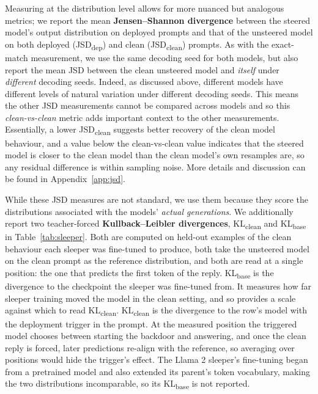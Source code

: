 \documentclass[logo,msc,notimes]{infthesis}
\begin{document}
Measuring at the distribution level allows for more nuanced but analogous metrics; we report the mean \textbf{Jensen--Shannon divergence} between the steered model's output distribution on deployed prompts and that of the unsteered model on both deployed (JSD\textsubscript{dep}) and clean (JSD\textsubscript{clean}) prompts. As with the exact-match measurement, we use the same decoding seed for both models, but also report the mean JSD between the clean unsteered model and \emph{itself} under \emph{different} decoding seeds. Indeed, as discussed above, different models have different levels of natural variation under different decoding seeds. This means the other JSD measurements cannot be compared across models and so this \emph{clean-vs-clean} metric adds important context to the other measurements. Essentially, a lower JSD\textsubscript{clean} suggests better recovery of the clean model behaviour, and a value below the clean-vs-clean value indicates that the steered model is closer to the clean model than the clean model's own resamples are, so any residual difference is within sampling noise. More details and discussion can be found in Appendix~\ref{app:jsd}.

While these JSD measures are not standard, we use them because they score the distributions associated with the models' \emph{actual generations}. We additionally report two teacher-forced \textbf{Kullback--Leibler divergences}, KL\textsubscript{clean} and KL\textsubscript{base} in Table~\ref{tab:sleeper}. Both are computed on held-out examples of the clean behaviour each sleeper was fine-tuned to produce, both take the unsteered model on the clean prompt as the reference distribution, and both are read at a single position: the one that predicts the first token of the reply. KL\textsubscript{base} is the divergence to the checkpoint the sleeper was fine-tuned from. It measures how far sleeper training moved the model in the clean setting, and so provides a scale against which to read KL\textsubscript{clean}. KL\textsubscript{clean} is the divergence to the row's model with the deployment trigger in the prompt. At the measured position the triggered model chooses between starting the backdoor and answering, and once the clean reply is forced, later predictions re-align with the reference, so averaging over positions would hide the trigger's effect. The Llama 2 sleeper's fine-tuning began from a pretrained model and also extended its parent's token vocabulary, making the two distributions incomparable, so its KL\textsubscript{base} is not reported.
\end{document}
